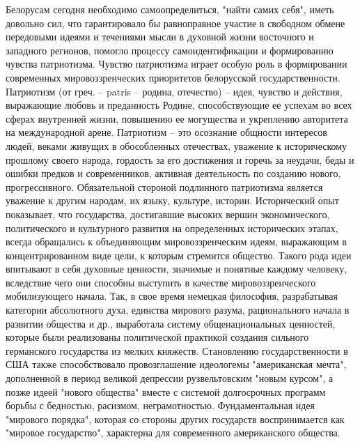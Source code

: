 Белорусам сегодня необходимо самоопределиться, "найти самих себя", иметь довольно сил, что гарантировало бы равноправное участие в свободном обмене передовыми идеями и течениями мысли в духовной жизни восточного и западного регионов, помогло процессу самоидентификации и формированию чувства патриотизма. Чувство патриотизма играет особую роль в формировании современных мировоззренческих приоритетов белорусской государственности. Патриотизм (от греч. – patris – родина, отечество) – идея, чувство и действия, выражающие любовь и преданность Родине, способствующие ее успехам во всех сферах внутренней жизни, повышению ее могущества и укреплению авторитета на международной арене. Патриотизм – это осознание общности интересов людей, веками живущих в обособленных отечествах, уважение к историческому прошлому своего народа, гордость за его достижения и горечь за неудачи, беды и ошибки предков и современников, активная деятельность по созданию нового, прогрессивного. Обязательной стороной подлинного патриотизма является уважение к другим народам, их языку, культуре, истории.
Исторический опыт показывает, что государства, достигавшие высоких вершин экономического, политического и культурного развития на определенных исторических этапах, всегда обращались к объединяющим мировоззренческим идеям, выражающим в концентрированном виде цели, к которым стремится общество. Такого рода идеи впитывают в себя духовные ценности, значимые и понятные каждому человеку, вследствие чего они способны выступить в качестве мировоззренческого мобилизующего начала. Так, в свое время немецкая философия, разрабатывая категории абсолютного духа, единства мирового разума, рационального начала в развитии общества и др., выработала систему общенациональных ценностей, которые были реализованы политической практикой создания сильного германского государства из мелких княжеств. Становлению государственности в США также способствовало провозглашение идеологемы "американская мечта", дополненной в период великой депрессии рузвельтовским "новым курсом", а позже идеей "нового общества" вместе с системой долгосрочных программ борьбы с бедностью, расизмом, неграмотностью. Фундаментальная идея "мирового порядка", которая со стороны других государств воспринимается как "мировое государство", характерна для современного американского общества.

